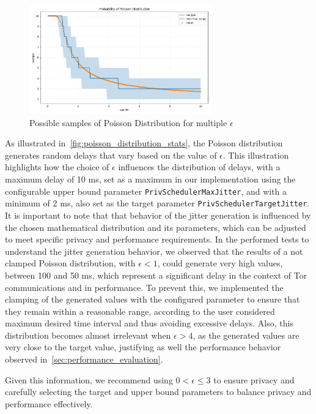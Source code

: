 \begin{figure}
    \centering
    \includegraphics[width=0.7\textwidth]{Chapters/Figures/Plots/epsilon_stats.png}
    \caption{Possible samples of Poisson Distribution for multiple $\epsilon$}\label{fig:poisson_distribution_stats}
\end{figure}

As illustrated in~\autoref{fig:poisson_distribution_stats}, the Poisson distribution generates random delays that vary based on the value of $\epsilon$. This illustration highlights how the choice of $\epsilon$ influences the distribution of delays, with a maximum delay of 10 ms, set as a maximum in our implementation using the configurable upper bound parameter \texttt{PrivSchedulerMaxJitter}, and with a minimum of 2 ms, also set as the target parameter \texttt{PrivSchedulerTargetJitter}. It is important to note that that behavior of the jitter generation is influenced by the chosen mathematical distribution and its parameters, which can be adjusted to meet specific privacy and performance requirements. In the performed tests to understand the jitter generation behavior, we observed that the results of a not clamped Poisson distribution, with $\epsilon < 1$, could generate very high values, between 100 and 50 ms, which represent a significant delay in the context of Tor communications and in performance. To prevent this, we implemented the clamping of the generated values with the configured parameter to ensure that they remain within a reasonable range, according to the user considered maximum desired time interval and thus avoiding excessive delays. Also, this distribution becomes almost irrelevant when $\epsilon > 4$, as the generated values are very close to the target value, justifying as well the performance behavior observed in~\autoref{sec:performance_evaluation}.

Given this information, we recommend using $0 < \epsilon \leq 3$ to ensure privacy and carefully selecting the target and upper bound parameters to balance privacy and performance effectively. 

